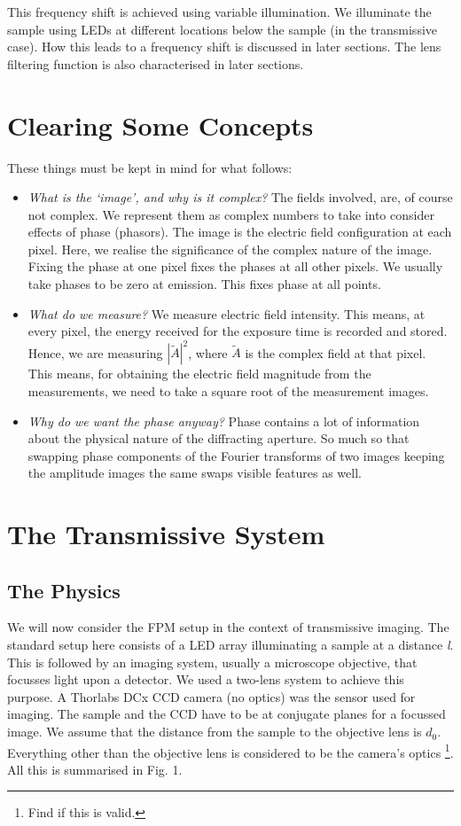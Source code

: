 \documentclass[11pt,a4paper,journal]{IEEEtran}
\begin{document}
This frequency shift is achieved using variable illumination. We illuminate the sample using LEDs at different locations below the sample (in the transmissive case). How this leads to a frequency shift is discussed in later sections. The lens filtering function is also characterised in later sections.

\section{Clearing Some Concepts}
These things must be kept in mind for what follows:
\begin{itemize}
\item \textit{What is the `image', and why is it complex?} The fields involved, are, of course not complex. We represent them as complex numbers to take into consider effects of phase (phasors). The image is the electric field configuration at each pixel. Here, we realise the significance of the complex nature of the image. Fixing the phase at one pixel fixes the phases at all other pixels. We usually take phases to be zero at emission. This fixes phase at all points.
\item \textit{What do we measure?} We measure electric field intensity. This means, at every pixel, the energy received for the exposure time is recorded and stored. Hence, we are measuring $|\tilde{A}|^2$, where $\tilde{A}$ is the complex field at that pixel. This means, for obtaining the electric field magnitude from the measurements, we need to take a square root of the measurement images.
\item \textit{Why do we want the phase anyway?} Phase contains a lot of information about the physical nature of the diffracting aperture. So much so that swapping phase components of the Fourier transforms of two images keeping the amplitude images the same swaps visible features as well.
\end{itemize}

\section{The Transmissive System}

\subsection{The Physics}
We will now consider the FPM setup in the context of transmissive imaging. The standard setup here consists of a LED array illuminating a sample at a distance \textit{l}. This is followed by an imaging system, usually a microscope objective, that focusses light upon a detector. We used a two-lens system to achieve this purpose. A Thorlabs DCx CCD camera (no optics) was the sensor used for imaging. The sample and the CCD have to be at conjugate planes for a focussed image. We assume that the distance from the sample to the objective lens is $d_0$. Everything other than the objective lens is considered to be the camera's optics \footnote{Find if this is valid.}. All this is summarised in Fig. 1.
\end{document}
